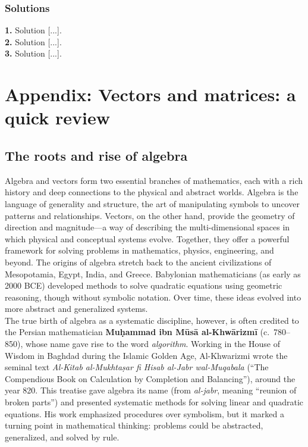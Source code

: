 \documentclass{book}
\begin{document}
\newpage

\subsection*{Solutions}

\textbf{1.} Solution [...].\\

\textbf{2.} Solution [...].\\

\textbf{3.} Solution [...].\\



\appendix



\chapter{Appendix: Vectors and matrices: a quick review}

\section{The roots and rise of algebra}

Algebra and vectors form two essential branches of mathematics, each with a rich history and deep connections to the physical and abstract worlds. Algebra is the language of generality and structure, the art of manipulating symbols to uncover patterns and relationships. Vectors, on the other hand, provide the geometry of direction and magnitude---a way of describing the multi-dimensional spaces in which physical and conceptual systems evolve. Together, they offer a powerful framework for solving problems in mathematics, physics, engineering, and beyond. The origins of algebra stretch back to the ancient civilizations of Mesopotamia, Egypt, India, and Greece. Babylonian mathematicians (as early as 2000 BCE) developed methods to solve quadratic equations using geometric reasoning, though without symbolic notation. Over time, these ideas evolved into more abstract and generalized systems.\\

The true birth of algebra as a systematic discipline, however, is often credited to the Persian mathematician \textbf{Muḥammad ibn Mūsā al-Khwārizmī} (c.~780--850), whose name gave rise to the word \emph{algorithm}. Working in the House of Wisdom in Baghdad during the Islamic Golden Age, Al-Khwarizmi wrote the seminal text \emph{Al-Kitab al-Mukhtaṣar fi Hisab al-Jabr wal-Muqabala} (``The Compendious Book on Calculation by Completion and Balancing''), around the year 820. This treatise gave algebra its name (from \emph{al-jabr}, meaning ``reunion of broken parts'') and presented systematic methods for solving linear and quadratic equations. His work emphasized procedures over symbolism, but it marked a turning point in mathematical thinking: problems could be abstracted, generalized, and solved by rule.
\end{document}

